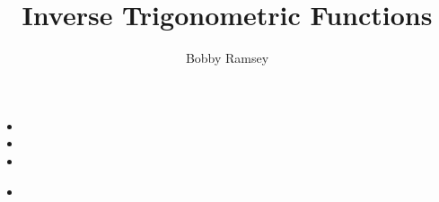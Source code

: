 \documentclass{ximera}
\author{Bobby Ramsey}
\title{Inverse Trigonometric Functions}
\begin{document}
\begin{abstract}
\end{abstract}
\maketitle


\begin{objectives}
	\item 
		\begin{itemize}
			\item 
			\item 
			\item 
		\end{itemize}
	
	\item
		\begin{itemize}
			\item 
		\end{itemize}
\end{objectives}
\end{document}
